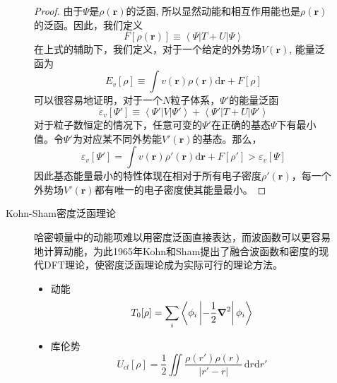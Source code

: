 \documentclass[12pt,a4paper,openany,twoside]{book}
\numberwithin{equation}{section}
\newcommand{\bracketl}[3]{\left\langle #1 \left| #2 \right| #3 \right\rangle}
\newcommand{\ud}{\mathrm{d}}
\begin{document}
\begin{description}
\begin{description}
                \begin{proof}
                  由于$\Psi$是$\rho(\textbf{r})$的泛函, 所以显然动能和相互作用能也是$\rho(\textbf{r})$的泛函。因此，我们定义 
                  \begin{equation}
                    F[\rho(\textbf{r})] \equiv \bracketl{\Psi}{T+U}{\Psi}
                  \end{equation}
                  在上式的辅助下，我们定义，对于一个给定的外势场$V(\textbf{r})$, 能量泛函为
                  \begin{equation}
                    E_v[\rho]\equiv \int v(\textbf{r})\rho(\textbf{r})\ud\textbf{r} + F[\rho]
                  \end{equation}
                  可以很容易地证明，对于一个$N$粒子体系，$\Psi'$的能量泛函
                  \begin{equation}
                    \varepsilon_v[\Psi']\equiv\bracketl{\Psi'}{V}{\Psi'}+\bracketl{\Psi'}{T+U}{\Psi'}
                  \end{equation}
                  对于粒子数恒定的情况下，任意可变的$\Psi'$在正确的基态$\Psi$下有最小值。令$\Psi'$为对应某不同外势能$V'(\textbf{r})$的基态。那么，
                  \begin{equation}
                    \varepsilon_v[\Psi']=\int v(\textbf{r})\rho'(\textbf{r})\ud\textbf{r}+F[\rho']>\varepsilon_v[\Psi]
                  \end{equation}
                  因此基态能量最小的特性体现在相对于所有电子密度$\rho'(\textbf{r})$，每一个外势场$V'(\textbf{r})$都有唯一的电子密度使其能量最小。\cite{PhysRev.136.B864} %
                \end{proof}
        
              \item[Kohn-Sham密度泛函理论] 哈密顿量中的动能项难以用密度泛函直接表达，而波函数可以更容易地计算动能，为此1965年Kohn和Sham提出了融合波函数和密度的现代DFT理论，使密度泛函理论成为实际可行的理论方法。
                \begin{itemize}
                  \item 动能
                    \begin{equation}
                      T_0[\rho]=\sum_i\bracketl{\phi_i}{-\frac{1}{2}\grad^2}{\phi_i}
                    \end{equation}
              
                  \item 库伦势
                    \begin{equation}
                      U_{cl}[\rho]=\frac{1}{2}\iint\frac{\rho(r')\rho(r)}{|r'-r|}\,\ud r\ud r'
                    \end{equation}
                \end{itemize}
            \end{description}
        \end{description}
\end{document}
